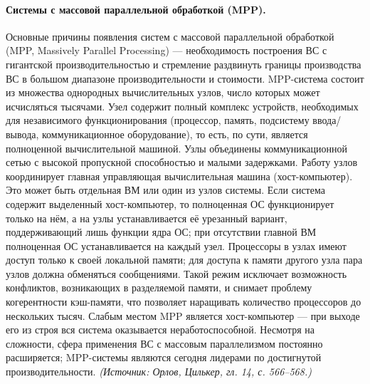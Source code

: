 \documentclass[a4paper,12pt]{article}
\begin{document}
\paragraph{Системы с массовой параллельной обработкой (MPP).}
Основные причины появления систем с массовой параллельной обработкой (MPP, Massively Parallel Processing) — необходимость построения ВС с гигантской производительностью и стремление раздвинуть границы производства ВС в большом диапазоне производительности и стоимости. MPP-система состоит из множества однородных вычислительных узлов, число которых может исчисляться тысячами. Узел содержит полный комплекс устройств, необходимых для независимого функционирования (процессор, память, подсистему ввода/вывода, коммуникационное оборудование), то есть, по сути, является полноценной вычислительной машиной. Узлы объединены коммуникационной сетью с высокой пропускной способностью и малыми задержками. Работу узлов координирует главная управляющая вычислительная машина (хост-компьютер). Это может быть отдельная ВМ или один из узлов системы. Если система содержит выделенный хост-компьютер, то полноценная ОС функционирует только на нём, а на узлы устанавливается её урезанный вариант, поддерживающий лишь функции ядра ОС; при отсутствии главной ВМ полноценная ОС устанавливается на каждый узел. Процессоры в узлах имеют доступ только к своей локальной памяти; для доступа к памяти другого узла пара узлов должна обменяться сообщениями. Такой режим исключает возможность конфликтов, возникающих в разделяемой памяти, и снимает проблему когерентности кэш-памяти, что позволяет наращивать количество процессоров до нескольких тысяч. Слабым местом MPP является хост-компьютер — при выходе его из строя вся система оказывается неработоспособной. Несмотря на сложности, сфера применения ВС с массовым параллелизмом постоянно расширяется; MPP-системы являются сегодня лидерами по достигнутой производительности.
\textit{(Источник: Орлов, Цилькер, гл. 14, с. 566--568.)}
\end{document}
